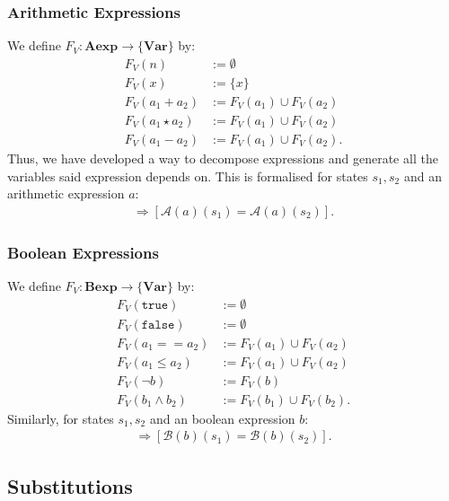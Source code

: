 \documentclass[a4paper, 12pt, twoside]{article}
\begin{document}
\subsubsection{Arithmetic Expressions}

We define $F_V : \textbf{Aexp} \to \{\textbf{Var}\}$ by: \begin{align*}
  F_V(n) &:= \emptyset \\
  F_V(x) &:= \{x\} \\
  F_V(a_1 + a_2) &:= F_V(a_1) \cup F_V(a_2) \\
  F_V(a_1 \star a_2) &:= F_V(a_1) \cup F_V(a_2) \\
  F_V(a_1 - a_2) &:= F_V(a_1) \cup F_V(a_2).
\end{align*} Thus, we have developed a way to decompose expressions
and generate all the variables said expression depends on. This
is formalised for states $s_1, s_2$ and an arithmetic expression 
$a$: \begin{gather*}
  [\forall x \in F_V(a)][s_1(x) = s_2(x)] \Longrightarrow 
  [\mathcal{A}(a)(s_1) = \mathcal{A}(a)(s_2)].
\end{gather*}

\subsubsection{Boolean Expressions}

We define $F_V : \textbf{Bexp} \to \{\textbf{Var}\}$ by: \begin{align*}
  F_V(\texttt{true}) &:= \emptyset \\
  F_V(\texttt{false}) &:= \emptyset \\
  F_V(a_1 == a_2) &:= F_V(a_1) \cup F_V(a_2) \\
  F_V(a_1 \leq a_2) &:= F_V(a_1) \cup F_V(a_2) \\
  F_V(\neg b) &:= F_V(b) \\
  F_V(b_1 \land b_2) &:= F_V(b_1) \cup F_V(b_2).
\end{align*} Similarly, for states $s_1, s_2$ and an boolean expression 
$b$: \begin{gather*}
  [\forall x \in F_V(b)][s_1(x) = s_2(x)] \Longrightarrow 
  [\mathcal{B}(b)(s_1) = \mathcal{B}(b)(s_2)].
\end{gather*}

\newpage

\subsection{Substitutions}
\end{document}
